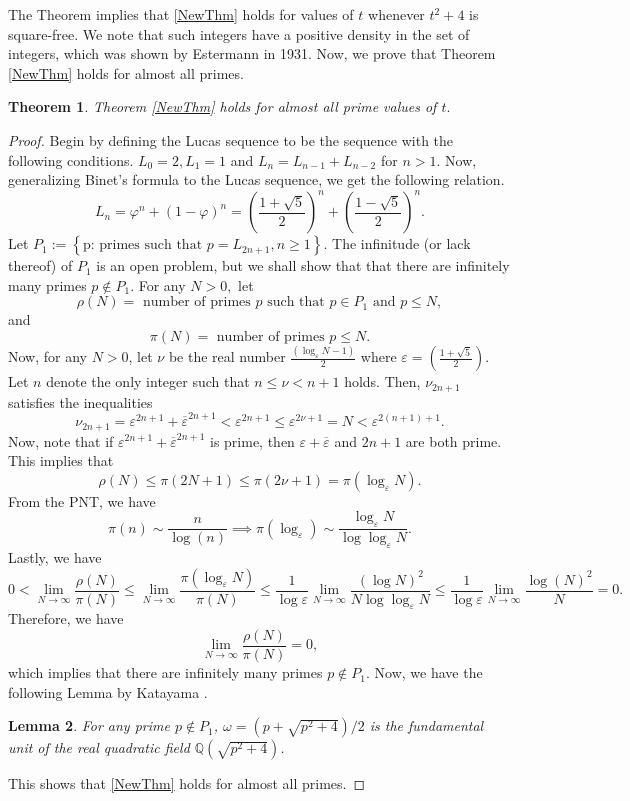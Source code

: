 \documentclass[12pt]{amsart}
\theoremstyle{plain}
\newtheorem{thm}{Theorem}
\newtheorem{lemma}[thm]{Lemma}
\theoremstyle{definition}
\theoremstyle{remark}
\numberwithin{equation}{section}
\numberwithin{thm}{section}
\theoremstyle{named}
\theoremstyle{named}
\begin{document}
The Theorem implies that \ref{NewThm} holds for values of $t$ whenever $t^2 + 4$ is square-free. We note that such integers have a positive density in the set of integers, which was shown by {Estermann} \cite{Estermann1931} in 1931. Now, we prove that Theorem \ref{NewThm} holds for almost all primes.
\begin{thm}
  Theorem \ref{NewThm} holds for almost all prime values of $t.$
\end{thm}
\begin{proof}
 Begin by defining the Lucas sequence to be the sequence with the following conditions. $L_0 = 2, L_1 = 1$ and $L_n = L_{n-1} + L_{n-2}$ for $ n > 1.$ Now, generalizing Binet's formula to the Lucas sequence, we get the following relation. $$L_n = \varphi^{n} + (1 - \varphi)^n =  \left( \frac{1 + \sqrt{5}}{2}\right)^n + \left(\frac{1- \sqrt{5}}{2} \right)^n.$$ Let $P_1 :=  \left \{  \text{p: primes such that $p = L_{2n+1}$}, n \geq1 \right \}$. The infinitude (or lack thereof) of $P_1$ is an open problem, but we shall show that that there are infinitely many primes $p \notin P_1.$ For any $N > 0,$  let $$\rho(N) = \text{ number of primes $p$ such that $p \in P_1$ and $p \le N$},$$ and $$ \pi(N) =  \text{ number of primes $p \leq N$}.$$ Now, for any $N > 0$, let $\nu$ be the real number  $ \frac{\left(\log_{\varepsilon}N - 1 \right)}2$ where $\varepsilon = \left(\frac{1 + \sqrt{5}}{2} \right)$. Let $n$ denote the only integer such that $n  \leq \nu < n+1$ holds. Then, $ \nu_{2n+1}$  satisfies the inequalities $$ \nu_{2n+1}  = \varepsilon^{2n+1} + \overline{\varepsilon}^{2n+1} < \varepsilon^{2n+1} \leq \varepsilon^{2 \nu + 1} = N < \varepsilon^{2(n+1) + 1}.$$ Now, note that if $\varepsilon^{2n+1} + \overline{\varepsilon}^{2n+1}$ is prime, then $\varepsilon + \overline{\varepsilon}$ and $2n+1$ are both prime. This implies that $$ \rho(N) \leq  \pi(2N+1) \leq \pi(2 \nu + 1)  = \pi(\log_{\varepsilon} N).$$ From the PNT, we have $$\pi(n) \sim \frac{n}{\log(n)} \implies \pi(\log_{\varepsilon}) \sim \frac{\log_{\varepsilon} N}{\log \log_{\varepsilon} N}.$$ Lastly, we have 
 $$ 0 < \lim_{N \to \infty} \frac{\rho(N)}{\pi(N)} \leq \lim_{N \to \infty} \frac{\pi(\log_{\varepsilon} N)}{\pi(N)} \leq \frac{1}{\log \varepsilon } \lim_{N \to \infty} \frac{(\log N)^2}{N \log \log_{\varepsilon} N} \leq \frac{1}{\log \varepsilon} \lim_{N \to \infty} \frac{\log(N)^2}{N}= 0.
$$ Therefore, we have $$ \lim_{N \to \infty} \frac{\rho(N)}{\pi(N)} = 0,$$
which implies that there are infinitely many primes $p \notin P_1$. Now, we have the following Lemma by {Katayama} \cite{Katayama1991OnFU}.
\begin{lemma}
    For any prime $p \notin P_1$, $\omega = \left(p + \sqrt{p^2 + 4}\right)\slash2$ is the fundamental unit of the real quadratic field $\mathbb{Q} (\sqrt{p^2 + 4}) $.
\end{lemma}
This shows that \ref{NewThm} holds for almost all primes.
\end{proof}  
\end{document}
